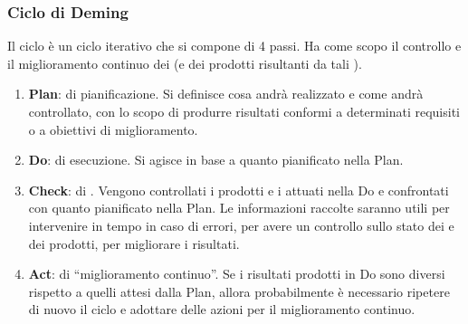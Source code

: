 \subsubsection{Ciclo di Deming} \label{AppPDCA}
Il ciclo  è un ciclo iterativo che si compone di 4 passi. Ha come scopo il controllo e il miglioramento continuo dei  (e dei prodotti risultanti da tali ). 
\begin{enumerate}
\item \textbf{Plan}:  di pianificazione. Si definisce cosa andrà realizzato e come andrà controllato, con lo scopo di produrre risultati conformi a determinati requisiti o a obiettivi di miglioramento.
\item \textbf{Do}:  di esecuzione. Si agisce in base a quanto pianificato nella  Plan.
\item \textbf{Check}:  di . Vengono controllati i prodotti e i  attuati nella  Do e confrontati con quanto pianificato nella  Plan. Le informazioni raccolte saranno utili per intervenire in tempo in caso di errori, per avere un controllo sullo stato dei  e dei prodotti, per migliorare i risultati.
\item \textbf{Act}:  di “miglioramento continuo”. Se i risultati prodotti in Do sono diversi rispetto a quelli attesi dalla  Plan, allora probabilmente è necessario ripetere di nuovo il ciclo  e adottare delle azioni per il miglioramento continuo.
\end{enumerate}
